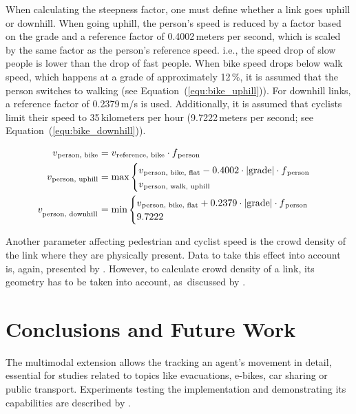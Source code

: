 When calculating the steepness factor, one must define whether a link goes uphill or downhill. When going uphill, the person's speed is reduced by a factor based on the grade and a reference factor of 0.4002\,meters per second, which is scaled by the same factor as the person's reference speed. i.e., the speed drop of slow people is lower than the drop of fast people. When bike speed drops below walk speed, which happens at a grade of approximately 12\,\%, it is assumed that the person switches to walking (see Equation~(\ref{equ:bike_uphill})). For downhill links, a reference factor of 0.2379\,m/s is used. Additionally, it is assumed that cyclists limit their speed to 35\,kilometers per hour (9.7222\,meters per second; see Equation~(\ref{equ:bike_downhill})).

{\fontsize{12.8pt}{12}
\begin{align}
    v\textsubscript{person, bike} &= v\textsubscript{reference, bike} \cdot f\textsubscript{person}\\
    v\textsubscript{person, uphill} &= \text{max}
    \begin{cases}
        v\textsubscript{person, bike, flat} - 0.4002 \cdot |\text{grade}| \cdot f\textsubscript{person}\\
        v\textsubscript{person, walk, uphill}
    \end{cases}\label{equ:bike_uphill}\\
    v_{\textsubscript{person, downhill}} &= \text{min}
    \begin{cases}
        v\textsubscript{person, bike, flat} + 0.2379 \cdot |\text{grade}| \cdot f\textsubscript{person}\\
        9.7222
    \end{cases}\label{equ:bike_downhill}
\end{align}
}%

Another parameter affecting pedestrian and cyclist speed is the crowd density of the link where they are physically present. Data to take this effect into account is, again, presented by \citet{Weidmann_TechRep_IVT_1992}. However, to calculate crowd density of a link, its geometry has to be taken into account, as \,discussed by \citet{Laemmel_PhDThesis_2011}. 

\section{Conclusions and Future Work}
The \gls{multimodal} \gls{extension} allows the tracking an agent's movement in detail, essential for studies related to topics like evacuations, e-bikes, car sharing or public transport. Experiments testing the implementation and demonstrating its capabilities are described by \citet{Dobler_PhDThesis_2013}.

